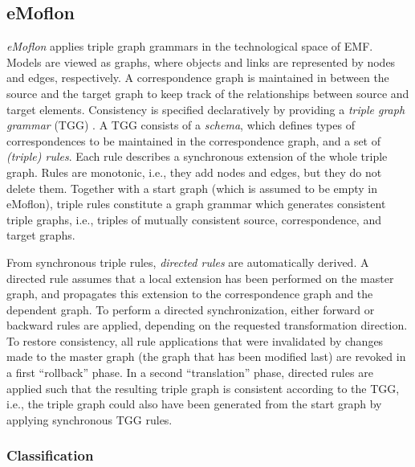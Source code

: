 \subsection{eMoflon}
\label{sec:eMoflon}


\emph{eMoflon} \cite{Leblebici2014a} applies triple graph grammars in the technological space of EMF.
Models are viewed as graphs, where objects and links are represented by nodes and edges, respectively.
A correspondence graph is maintained in between the source and the target graph to keep track of the relationships between source and target elements.
Consistency is specified declaratively by providing a \emph{triple graph grammar} (TGG) \cite{Schurr1994}.
A TGG consists of a \emph{schema}, which defines types of correspondences to be maintained in the correspondence graph, and a set of \emph{(triple) rules}. Each rule describes a synchronous extension of the whole triple graph. Rules are monotonic, i.e., they add nodes and edges, but they do not delete them. Together with a start graph (which is assumed to be empty in eMoflon), triple rules constitute a graph grammar which generates consistent triple graphs, i.e., triples of mutually consistent source, correspondence, and target graphs.

From synchronous triple rules, \emph{directed rules} are automatically derived.
A directed rule assumes that a local extension has been performed on the master graph, and propagates this extension to the correspondence graph and the dependent graph.
To perform a directed synchronization, either forward or backward rules are applied, depending on the requested transformation direction.
To restore consistency, all rule applications that were invalidated by changes made to the master graph (the graph that has been modified last) are revoked in a first ``rollback'' phase.
In a second ``translation'' phase, directed rules are applied such that the resulting triple graph is consistent according to the TGG, i.e., the triple graph could also have been generated from the start graph by applying synchronous TGG rules.   

\subsubsection{Classification}
\label{sec:ClassificationEMoflon}

